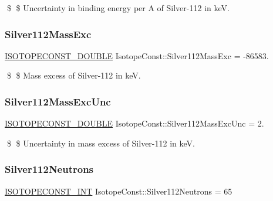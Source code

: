 \$ \$ Uncertainty in binding energy per A of Silver-\/112 in keV. \mbox{\label{group___isotope_const-_silver-_ag112_ga4e94f7e31bedc99e92867548ae04879c}} 
\subsubsection{\texorpdfstring{Silver112\+Mass\+Exc}{Silver112MassExc}}
{\footnotesize\ttfamily \mbox{\hyperlink{group___isotope_const-_macros_ga8f45a7272ce02c0b4c65c44636ed719a}{I\+S\+O\+T\+O\+P\+E\+C\+O\+N\+S\+T\+\_\+\+D\+O\+U\+B\+LE}} Isotope\+Const\+::\+Silver112\+Mass\+Exc = -\/86583.}

\$ \$ Mass excess of Silver-\/112 in keV. \mbox{\label{group___isotope_const-_silver-_ag112_gac12f043367052858f8255f2e84316b50}} 
\subsubsection{\texorpdfstring{Silver112\+Mass\+Exc\+Unc}{Silver112MassExcUnc}}
{\footnotesize\ttfamily \mbox{\hyperlink{group___isotope_const-_macros_ga8f45a7272ce02c0b4c65c44636ed719a}{I\+S\+O\+T\+O\+P\+E\+C\+O\+N\+S\+T\+\_\+\+D\+O\+U\+B\+LE}} Isotope\+Const\+::\+Silver112\+Mass\+Exc\+Unc = 2.}

\$ \$ Uncertainty in mass excess of Silver-\/112 in keV. \mbox{\label{group___isotope_const-_silver-_ag112_ga7df960702ffc436222f25fe59a3cc36d}} 
\subsubsection{\texorpdfstring{Silver112\+Neutrons}{Silver112Neutrons}}
{\footnotesize\ttfamily \mbox{\hyperlink{group___isotope_const-_macros_ga5f18360b3e99483a35c32d789e62621c}{I\+S\+O\+T\+O\+P\+E\+C\+O\+N\+S\+T\+\_\+\+I\+NT}} Isotope\+Const\+::\+Silver112\+Neutrons = 65}

